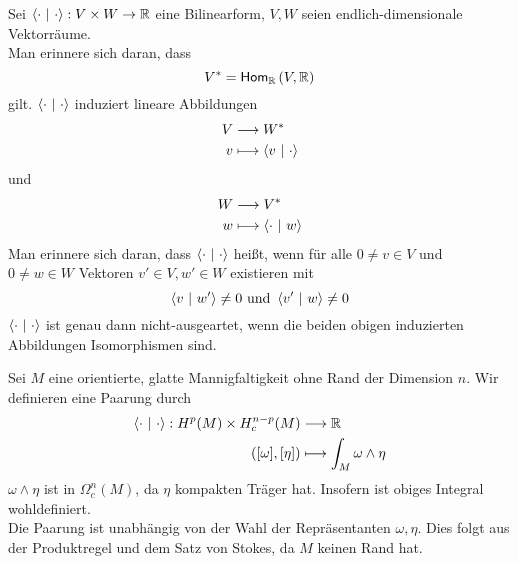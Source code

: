\Bem{}
Sei $\left<\cdot ~|~ \cdot\right> : V\times W \overset{}{\rightarrow} \mathbb{R}$ eine Bilinearform, $V,W$ seien endlich-dimensionale Vektorräume.\\
Man erinnere sich daran, dass
\[ V^* = \textsf{Hom}_{\mathbb{R}}\left(V, \mathbb{R}\right) \]
gilt. $\left<\cdot ~|~\cdot \right>$ induziert lineare Abbildungen
\begin{align*}
V & \overset{}{\longrightarrow} W^*\\
v & \longmapsto \left<v~|~\cdot\right>
\end{align*}
und
\begin{align*}
W & \overset{}{\longrightarrow} V^*\\
w & \longmapsto \left<\cdot~|~w\right>
\end{align*}
Man erinnere sich daran, dass $\left<\cdot ~|~\cdot\right>$  heißt, wenn für alle $0\neq v \in V$ und $0\neq w \in W$ Vektoren $v'\in V, w'\in W$ existieren mit
\[ \left<v~|~w'\right> \neq 0 \text{  und  } \left<v'~|~w\right> \neq 0 \]
\Lem{}
$\left<\cdot ~|~ \cdot\right>$ ist genau dann {nicht-ausgeartet}, wenn die beiden obigen induzierten Abbildungen Isomorphismen sind.

\Def{}
Sei $M$ eine orientierte, glatte Mannigfaltigkeit ohne Rand der Dimension $n$. Wir definieren eine Paarung durch
\begin{align*}
\left<\cdot ~|~\cdot\right> :H^p(M) \times H^{n-p}_c(M) &\overset{}{\longrightarrow} \mathbb{R}\\
([\omega], [\eta]) & \longmapsto \int_M \omega \wedge \eta
\end{align*}
$\omega \wedge \eta$ ist in $\Omega^n_c(M)$, da $\eta$ kompakten Träger hat. Insofern ist obiges Integral wohldefiniert.\\
Die Paarung ist unabhängig von der Wahl der Repräsentanten $\omega, \eta$. Dies folgt aus der Produktregel und dem Satz von Stokes, da $M$ keinen Rand hat.

